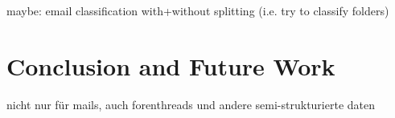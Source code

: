 \documentclass{llncs}
\begin{document}
maybe: email classification with+without splitting (i.e. try to classify folders)

\section{Conclusion and Future Work}
nicht nur für mails, auch forenthreads und andere semi-strukturierte daten




 
\end{document}
